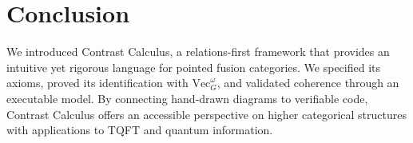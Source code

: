 \documentclass[11pt]{article}
\theoremstyle{definition}
\theoremstyle{remark}
\begin{document}
\section{Conclusion}
We introduced Contrast Calculus, a relations-first framework that provides an intuitive yet rigorous language for pointed fusion categories. We specified its axioms, proved its identification with $\mathrm{Vec}_G^\omega$, and validated coherence through an executable model. By connecting hand-drawn diagrams to verifiable code, Contrast Calculus offers an accessible perspective on higher categorical structures with applications to TQFT and quantum information.



\end{document}
